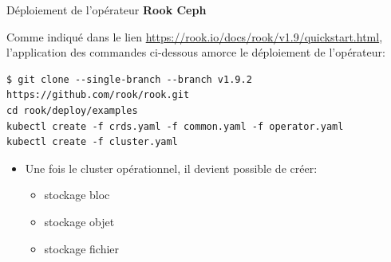 
\begin{frame}[fragile]{Déploiement de l'opérateur \textbf{Rook Ceph}}

   Comme indiqué dans le lien \url{https://rook.io/docs/rook/v1.9/quickstart.html}, l'application des commandes ci-dessous amorce le déploiement de l'opérateur:

\begin{tiny}
\begin{Verbatim}[commandchars=\\\{\}]
$ git clone --single-branch --branch v1.9.2 https://github.com/rook/rook.git
cd rook/deploy/examples
kubectl create -f crds.yaml -f common.yaml -f operator.yaml
kubectl create -f cluster.yaml
\end{Verbatim}
\end{tiny}

\begin{itemize}
   \item Une fois le cluster opérationnel, il devient possible de créer:
   \begin{itemize}
      \item stockage bloc
      \item stockage objet
      \item stockage fichier
   \end{itemize}
\end{itemize}

\end{frame}


